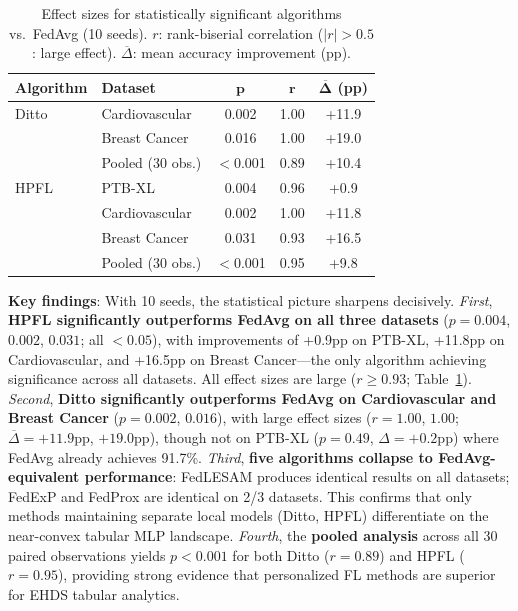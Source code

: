 \documentclass[conference]{IEEEtran}
\begin{document}
\begin{table}[t]
\centering
\caption{Effect sizes for statistically significant algorithms vs.\ FedAvg (10 seeds). $r$: rank-biserial correlation ($|r| > 0.5$: large effect). $\overline{\Delta}$: mean accuracy improvement (pp).}
\label{tab:effect_sizes}
\small
\begin{tabular}{llccc}
\toprule
\textbf{Algorithm} & \textbf{Dataset} & $\boldsymbol{p}$ & $\boldsymbol{r}$ & $\boldsymbol{\overline{\Delta}}$ \textbf{(pp)} \\
\midrule
Ditto & Cardiovascular & 0.002 & 1.00 & +11.9 \\
 & Breast Cancer & 0.016 & 1.00 & +19.0 \\
 & Pooled (30 obs.) & $<$0.001 & 0.89 & +10.4 \\
\midrule
HPFL & PTB-XL & 0.004 & 0.96 & +0.9 \\
 & Cardiovascular & 0.002 & 1.00 & +11.8 \\
 & Breast Cancer & 0.031 & 0.93 & +16.5 \\
 & Pooled (30 obs.) & $<$0.001 & 0.95 & +9.8 \\
\bottomrule
\end{tabular}
\end{table}

\textbf{Key findings}: With 10 seeds, the statistical picture sharpens decisively. \textit{First}, \textbf{HPFL significantly outperforms FedAvg on all three datasets} ($p = 0.004$, $0.002$, $0.031$; all $< 0.05$), with improvements of +0.9pp on PTB-XL, +11.8pp on Cardiovascular, and +16.5pp on Breast Cancer---the only algorithm achieving significance across all datasets. All effect sizes are large ($r \geq 0.93$; Table~\ref{tab:effect_sizes}). \textit{Second}, \textbf{Ditto significantly outperforms FedAvg on Cardiovascular and Breast Cancer} ($p = 0.002$, $0.016$), with large effect sizes ($r = 1.00$, $1.00$; $\overline{\Delta} = +11.9$pp, $+19.0$pp), though not on PTB-XL ($p = 0.49$, $\Delta = +0.2$pp) where FedAvg already achieves 91.7\%. \textit{Third}, \textbf{five algorithms collapse to FedAvg-equivalent performance}: FedLESAM produces identical results on all datasets; FedExP and FedProx are identical on 2/3 datasets. This confirms that only methods maintaining separate local models (Ditto, HPFL) differentiate on the near-convex tabular MLP landscape. \textit{Fourth}, the \textbf{pooled analysis} across all 30 paired observations yields $p < 0.001$ for both Ditto ($r = 0.89$) and HPFL ($r = 0.95$), providing strong evidence that personalized FL methods are superior for EHDS tabular analytics.
\end{document}
